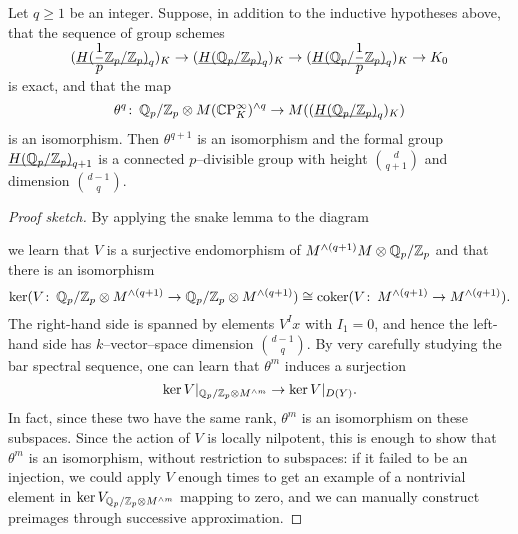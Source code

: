 \begin{theorem}
Let $q \ge 1$ be an integer.  Suppose, in addition to the inductive hypotheses above, that the sequence of group schemes \[(\underline{\smash{H(\frac{1}{p}\mathbb Z_p / \mathbb Z_p)}}_{q})_K \to (\underline{\smash{H(\mathbb{Q}_p/\mathbb Z_p)}}_{q})_K \to (\underline{\smash{H(\mathbb{Q}_p / \frac{1}{p}\mathbb Z_p)}}_{q})_K \to K_0\] is exact, and that the map \[\theta^q\colon\thinspace \mathbb{Q}_p / \mathbb Z_p \otimes M(\mathbb{C}\mathrm P^\infty_K)^{\wedge q} \to M((\underline{\smash{H(\mathbb{Q}_p/\mathbb Z_p)}}_{q})_K)\] is an isomorphism.  Then $\theta^{q+1}$ is an isomorphism and the formal group $\underline{\smash{H(\mathbb{Q}_p/\mathbb Z_p)}}_{q+1}$ is a connected $p$--divisible group with height $\binom{d}{q+1}$ and dimension $\binom{d-1}{q}$.
\end{theorem}
\begin{proof}[Proof sketch]
By applying the snake lemma to the diagram
\begin{center}
\end{center}
we learn that $V$ is a surjective endomorphism of $M^{\wedge (q+1)} M \otimes \mathbb{Q}_p/\mathbb Z_p$ and that there is an isomorphism \[\ker(V\colon\thinspace \mathbb{Q}_p/\mathbb Z_p \otimes M^{\wedge (q+1)} \to \mathbb{Q}_p/\mathbb Z_p \otimes M^{\wedge (q+1)}) \cong \operatorname{coker}(V\colon\thinspace M^{\wedge (q+1)} \to M^{\wedge (q+1)}).\]  The right-hand side is spanned by elements $V^I x$ with $I_1 = 0$, and hence the left-hand side has $k$--vector--space dimension $\binom{d-1}{q}$.  By very carefully studying the bar spectral sequence, one can learn that $\theta^m$ induces a surjection \[\ker V|_{\mathbb{Q}_p / \mathbb Z_p \otimes M^{\wedge m}} \to \ker V|_{D(Y)}.\]  In fact, since these two have the same rank, $\theta^m$ is an isomorphism on these subspaces.  Since the action of $V$ is locally nilpotent, this is enough to show that $\theta^m$ is an isomorphism, without restriction to subspaces: if it failed to be an injection, we could apply $V$ enough times to get an example of a nontrivial element in $\ker V_{\mathbb{Q}_p / \mathbb Z_p \otimes M^{\wedge m}}$ mapping to zero, and we can manually construct preimages through successive approximation.
\end{proof}


